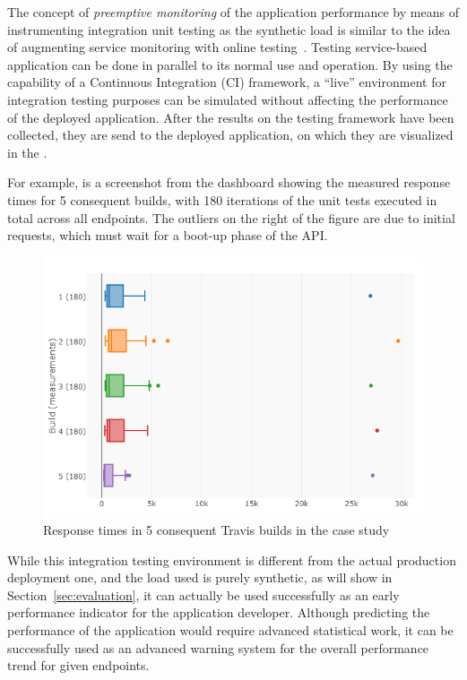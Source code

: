 \documentclass[conference]{IEEEtran}
\begin{document}
  The concept of {\em preemptive monitoring} of the application performance by means of instrumenting integration unit testing as the synthetic load is similar to the idea of augmenting service monitoring with online testing~\cite{metzger2010proactive}. Testing service-based application can be done in parallel to its normal use and operation. By using the capability of a Continuous Integration (CI) framework, a ``live'' environment for integration testing purposes can be simulated without affecting the performance of the deployed application. After the results on the testing framework have been collected, they are send to the deployed application, on which they are visualized in the \tool.  
  
  For example,  is a screenshot from the dashboard showing the measured response times for 5 consequent builds, with 180 iterations of the unit tests executed in total across all endpoints. The outliers on the right of the figure are due to initial requests, which must wait for a boot-up phase of the API.  

    \begin{figure}[h!]
        \centering
        \includegraphics[width=\columnwidth]{travis_builds}
        \caption{Response times in 5 consequent Travis builds in the \zee case study}
        \label{fig:builds}
      \end{figure}
  
  While this integration testing environment is different from the actual production deployment one, and the load used is purely synthetic, as will show in Section~\ref{sec:evaluation}, it can actually be used successfully as an early performance indicator for the application developer. Although predicting the performance of the application would require advanced statistical work, it can be successfully used as an advanced warning system for the overall performance trend for given endpoints.  
\end{document}
